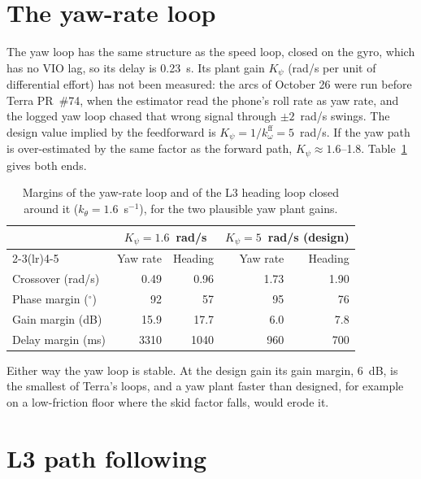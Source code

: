 \section{The yaw-rate loop}
\label{sec:stab-yaw}

The yaw loop has the same structure as the speed loop, closed on the gyro, which has no VIO lag, so its delay is 0.23~s.
Its plant gain $K_\psi$ (rad/s per unit of differential effort) has not been measured: the arcs of October 26 were run before Terra PR~\#74, when the estimator read the phone's roll rate as yaw rate, and the logged yaw loop chased that wrong signal through $\pm 2$~rad/s swings.
The design value implied by the feedforward is $K_\psi = 1/k^{\text{ff}}_\omega = 5$~rad/s.
If the yaw path is over-estimated by the same factor as the forward path, $K_\psi \approx 1.6$--1.8.
Table~\ref{tab:stab-yaw} gives both ends.

\begin{table}[ht]
\centering
\caption{Margins of the yaw-rate loop and of the L3 heading loop closed around it ($k_\theta = 1.6$~s$^{-1}$), for the two plausible yaw plant gains.}
\label{tab:stab-yaw}
\small
\begin{tabular}{@{}l r r r r@{}}
\toprule
& \multicolumn{2}{c}{$K_\psi = 1.6$~rad/s} & \multicolumn{2}{c}{$K_\psi = 5$~rad/s (design)} \\
\cmidrule(lr){2-3}\cmidrule(lr){4-5}
& Yaw rate & Heading & Yaw rate & Heading \\
\midrule
Crossover (rad/s) & 0.49 & 0.96 & 1.73 & 1.90 \\
Phase margin ($^\circ$) & 92 & 57 & 95 & 76 \\
Gain margin (dB) & 15.9 & 17.7 & 6.0 & 7.8 \\
Delay margin (ms) & 3310 & 1040 & 960 & 700 \\
\bottomrule
\end{tabular}
\end{table}

Either way the yaw loop is stable.
At the design gain its gain margin, 6~dB, is the smallest of Terra's loops, and a yaw plant faster than designed, for example on a low-friction floor where the skid factor falls, would erode it.

\section{L3 path following}
\label{sec:stab-l3}

